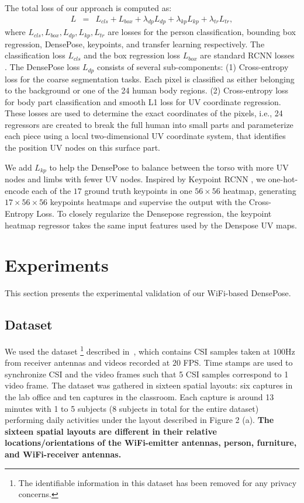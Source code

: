 \documentclass[sigconf, anonymous=false]{acmart}
\begin{document}
The total loss of our approach is computed as:
\begin{eqnarray}
   \nonumber L &=& L_{cls} + L_{box} + \lambda_{dp} L_{dp} + \lambda_{kp} L_{kp}+ \lambda_{tr} L_{tr},
\end{eqnarray}
where $L_{cls}, L_{box}, L_{dp}, L_{kp}, L_{tr}$ are losses for the person classification, bounding box regression, DensePose, keypoints, and transfer learning respectively. The classification loss $L_{cls}$ and the box regression loss $L_{box}$ are standard RCNN losses \cite{Faster-RCNN,Mask-RCNN}.
The DensePose loss $L_{dp}$\cite{DensePose} consists of several sub-components: (1) Cross-entropy loss for the coarse segmentation tasks. Each pixel is classified as either belonging to the background or one of the 24 human body regions. (2) Cross-entropy loss for body part classification and smooth L1 loss for UV coordinate regression. These losses are used to determine the exact coordinates of the pixels, i.e., 24 regressors are created to break the full human into small parts and parameterize each piece using a local two-dimensional UV coordinate system, that identifies the position UV nodes on this surface part. 

We add $L_{kp}$ to help the DensePose to balance between the torso with more UV nodes and limbs with fewer UV nodes. Inspired by Keypoint RCNN \cite{Mask-RCNN}, we one-hot-encode each of the $17$ ground truth keypoints in one $56 \times 56$ heatmap, generating $17 \times 56 \times 56$ keypoints heatmaps and supervise the output with the Cross-Entropy Loss. To closely regularize the Densepose regression, the keypoint heatmap regressor takes the same input features used by the Denspose UV maps. 

\section{Experiments}

This section presents the experimental validation of our WiFi-based DensePose. 

\subsection{Dataset}
We used the dataset \footnote{The identifiable information in this dataset has been removed for any privacy concerns.} described in~\cite{Wanghuang2019}, which contains CSI samples taken at $100$Hz from receiver antennas and videos recorded at $20$ FPS. Time stamps are used to synchronize CSI and the video frames such that 5 CSI samples correspond to 1 video frame. The dataset was gathered in sixteen spatial layouts: six captures in the lab office and ten captures in the classroom. Each capture is around 13 minutes with 1 to 5 subjects (8 subjects in total for the entire dataset) performing daily activities under the layout described in Figure 2 (a). \textbf{The sixteen spatial layouts are different in their relative locations/orientations of the WiFi-emitter antennas, person, furniture, and WiFi-receiver antennas.}  
\end{document}

